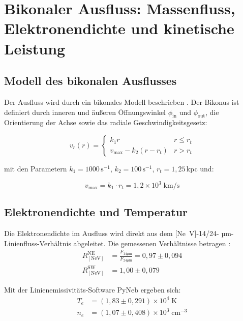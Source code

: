 ﻿\documentclass[12pt,a4paper]{report}
\begin{document}
\section{Bikonaler Ausfluss: Massenfluss, Elektronendichte und kinetische Leistung}

\subsection{Modell des bikonalen Ausflusses}

Der Ausfluss wird durch ein bikonales Modell beschrieben \cite{kader2026}. Der Bikonus ist definiert durch inneren und äußeren Öffnungswinkel $\phi_\mathrm{in}$ und $\phi_\mathrm{out}$, die Orientierung der Achse sowie das radiale Geschwindigkeitsgesetz:

\begin{equation}
	v_r(r) = \begin{cases}
		k_1 r           & r \leq r_t \\
		v_\mathrm{max} - k_2(r - r_t) & r > r_t
	\end{cases}
\end{equation}

mit den Parametern $k_1 = 1000\,\text{s}^{-1}$, $k_2 = 100\,\text{s}^{-1}$, $r_t = 1{,}25$\,kpc und:

\begin{equation}
	\boxed{v_\mathrm{max} = k_1 \cdot r_t = 1{,}2 \times 10^3\;\text{km/s}}
\end{equation}

\subsection{Elektronendichte und Temperatur}

Die Elektronendichte im Ausfluss wird direkt aus dem [Ne~V]-14/24- µm-Linien\-fluss-Verhältnis abgeleitet. Die gemessenen Verhältnisse betragen \cite{kader2026}:
\begin{align}
	R_\mathrm{[NeV]}^\mathrm{NE} &= \frac{F_{14\mu\text{m}}}{F_{24\mu\text{m}}} = 0{,}97 \pm 0{,}094 \\
	R_\mathrm{[NeV]}^\mathrm{SW} &= 1{,}00 \pm 0{,}079
\end{align}

Mit der Linien\-emissivitäts-Software PyNeb ergeben sich:
\begin{align}
	T_e &= (1{,}83 \pm 0{,}291) \times 10^4\;\text{K} \\
	n_e &= (1{,}07 \pm 0{,}408) \times 10^3\;\text{cm}^{-3}
\end{align}
\end{document}
